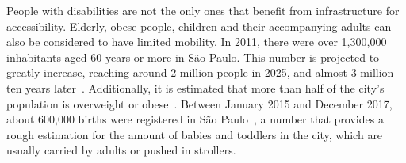 \documentclass[12pt]{article}
\begin{document}
People with disabilities are not the only ones that benefit from infrastructure for accessibility.
Elderly, obese people, children and their accompanying adults
can also be considered to have limited mobility.
%
In 2011, there were over 1,300,000 inhabitants aged 60 years or more in São Paulo.
This number is projected to greatly increase, reaching around 2 million people in 2025,
and almost 3 million ten years later~\cite{SAEDE:1}.
%
Additionally, it is estimated that more than half of the city's population is overweight or obese~\cite{isa-capital}.
%
Between January 2015 and December 2017,
about 600,000 births were registered in São Paulo~\cite{tabnet},
a number that provides a rough estimation for the amount of
babies and toddlers in the city,
which are usually carried by adults or pushed in strollers.

\end{document}
